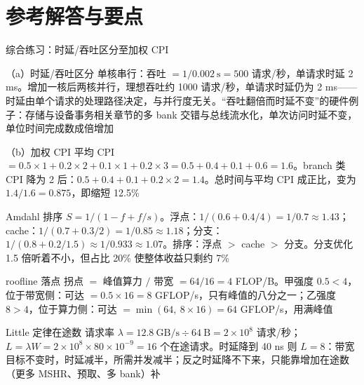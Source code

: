 \section*{参考解答与要点}

\begin{chapteranswer}{综合练习：时延/吞吐区分至加权 CPI}
\begin{answersubproblem}{（a）时延/吞吐区分}
单核串行：吞吐 $=1/0.002\ \mathrm{s}=500$ 请求/秒，单请求时延 2 ms。增加一核后两核并行，理想吞吐约 1000 请求/秒，单请求时延仍为 2 ms——时延由单个请求的处理路径决定，与并行度无关。“吞吐翻倍而时延不变”的硬件例子：存储与设备事务相关章节的多 bank 交错与总线流水化，单次访问时延不变，单位时间完成数成倍增加
\end{answersubproblem}
\begin{answersubproblem}{（b）加权 CPI}
平均 CPI $=0.5\times1+0.2\times2+0.1\times1+0.2\times3=0.5+0.4+0.1+0.6=1.6$。branch 类 CPI 降为 2 后：$0.5+0.4+0.1+0.2\times2=1.4$。总时间与平均 CPI 成正比，变为 $1.4/1.6=0.875$，即缩短 12.5\%
\end{answersubproblem}
\end{chapteranswer}

\begin{chapteranswer}{Amdahl 排序}
$S=1/(1-f+f/s)$。浮点：$1/(0.6+0.4/4)=1/0.7\approx1.43$；cache：$1/(0.7+0.3/2)=1/0.85\approx1.18$；分支：$1/(0.8+0.2/1.5)\approx1/0.933\approx1.07$。排序：浮点 $>$ cache $>$ 分支。分支优化 1.5 倍听着不小，但占比 20\% 使整体收益只剩约 7\%
\end{chapteranswer}

\begin{chapteranswer}{roofline 落点}
拐点 $=$ 峰值算力 $/$ 带宽 $=64/16=4$ FLOP/B。甲强度 $0.5<4$，位于带宽侧：可达 $=0.5\times16=8$ GFLOP/s，只有峰值的八分之一；乙强度 $8>4$，位于算力侧：可达 $=\min(64,\ 8\times16)=64$ GFLOP/s，用满峰值
\end{chapteranswer}

\begin{chapteranswer}{Little 定律在途数}
请求率 $\lambda=12.8\ \mathrm{GB/s}\div64\ \mathrm{B}=2\times10^{8}$ 请求/秒；$L=\lambda W=2\times10^{8}\times80\times10^{-9}=16$ 个在途请求。时延降到 40 ns 则 $L=8$：带宽目标不变时，时延减半，所需并发减半；反之时延降不下来，只能靠增加在途数（更多 MSHR、预取、多 bank）补
\end{chapteranswer}

